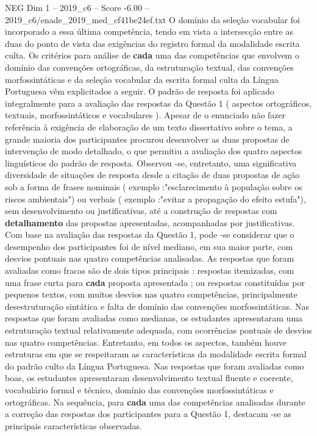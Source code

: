 \begin{textsample}{NEG Dim 1 – 2019\_c6 – Score -6.00 – 2019\_c6/enade\_2019\_med\_cf41be24ef.txt}
O domínio da seleção vocabular foi incorporado a essa última competência, tendo em vista a intersecção entre as duas do ponto de vista das exigências do registro formal da modalidade escrita culta.
Os critérios para análise de \textbf{cada} uma das competências que envolvem o domínio das convenções ortográficas, da estruturação textual, das convenções morfossintáticas e da seleção vocabular da escrita formal culta da Língua Portuguesa vêm explicitados a seguir.
O padrão de resposta foi aplicado integralmente para a avaliação das respostas da Questão 1 ( aspectos ortográficos, textuais, morfossintáticos e vocabulares ).
Apesar de o enunciado não fazer referência à exigência de elaboração de um texto dissertativo sobre o tema, a grande maioria dos participantes procurou desenvolver as duas propostas de intervenção de modo detalhado, o que permitiu a avaliação dos quatro aspectos linguísticos do padrão de resposta.
Observou -se, entretanto, uma significativa diversidade de situações de resposta desde a citação de duas propostas de ação sob a forma de frases nominais ( exemplo :"esclarecimento à população sobre os riscos ambientais") ou verbais ( exemplo :"evitar a propagação do efeito estufa"), sem desenvolvimento ou justificativas, até a construção de respostas com \textbf{detalhamento} das propostas apresentadas, acompanhadas por justificativas.
Com base na avaliação das respostas da Questão 1, pode -se considerar que o desempenho dos participantes foi de nível mediano, em sua maior parte, com desvios pontuais nas quatro competências analisadas.
As respostas que foram avaliadas como fracas são de dois tipos principais : respostas itemizadas, com uma frase curta para \textbf{cada} proposta apresentada ; ou respostas constituídas por pequenos textos, com muitos desvios nas quatro competências, principalmente desestruturação sintática e falta de domínio das convenções morfossintáticas.
Nas respostas que foram avaliadas como medianas, os estudantes apresentaram uma estruturação textual relativamente adequada, com ocorrências pontuais de desvios nas quatro competências.
Entretanto, em todos os aspectos, também houve estruturas em que se respeitaram as características da modalidade escrita formal do padrão culto da Língua Portuguesa.
Nas respostas que foram avaliadas como boas, os estudantes apresentaram desenvolvimento textual fluente e coerente, vocabulário formal e técnico, domínio das convenções morfossintáticas e ortográficas.
Na sequência, para \textbf{cada} uma das competências analisadas durante a correção das respostas dos participantes para a Questão 1, destacam -se as principais características observadas.

\end{textsample}
